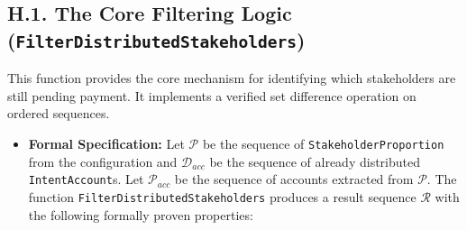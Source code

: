 \documentclass[
  english,
  onecolumn]{article}
\begin{document}
\subsection{\texorpdfstring{H.1. The Core Filtering Logic
(\texttt{FilterDistributedStakeholders})}{H.1. The Core Filtering Logic (FilterDistributedStakeholders)}}\label{h.1.-the-core-filtering-logic-filterdistributedstakeholders}

This function provides the core mechanism for identifying which
stakeholders are still pending payment. It implements a verified set
difference operation on ordered sequences.

\begin{itemize}
\item
  \textbf{Formal Specification:} Let \(\mathcal{P}\) be the sequence of
  \texttt{StakeholderProportion} from the configuration and
  \(\mathcal{D}_{acc}\) be the sequence of already distributed
  \texttt{IntentAccount}s. Let \(\mathcal{P}_{acc}\) be the sequence of
  accounts extracted from \(\mathcal{P}\). The function
  \texttt{FilterDistributedStakeholders} produces a result sequence
  \(\mathcal{R}\) with the following formally proven properties:


\end{itemize}
\end{document}

